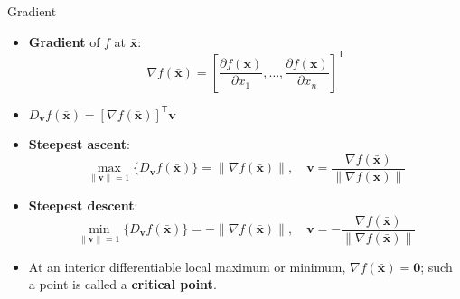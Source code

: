 \documentclass[aspectratio=169,hyperref,UTF8,CJK]{beamer}
\newcommand{\trans}{\mathsf{T}}
\newcommand{\vect}[1]{\boldsymbol{#1}}
\begin{document}
\begin{frame}{Gradient}
  \small
  \begin{itemize}
    \item \textbf{Gradient} of $f$ at $\bar{\vect{x}}$:
      \begin{equation*}
        \nabla f(\bar{\vect{x}})=
        \left[\frac{\partial f(\bar{\vect{x}})}{\partial x_1},\ldots,
        \frac{\partial f(\bar{\vect{x}})}{\partial x_n}\right]^{\trans}
      \end{equation*}
    \item $D_{\vect{v}}f(\bar{\vect{x}})=[\nabla f(\bar{\vect{x}})]^{\trans}\vect{v}$
    \item \textbf{Steepest ascent}:
      \begin{equation*}
        \max_{\|\vect{v}\|=1}\{D_{\vect{v}}f(\bar{\vect{x}})\}=\|\nabla f(\bar{\vect{x}})\|,
        \quad \vect{v}=\frac{\nabla f(\bar{\vect{x}})}{\|\nabla f(\bar{\vect{x}})\|}
      \end{equation*}
    \item \textbf{Steepest descent}:
      \begin{equation*}
        \min_{\|\vect{v}\|=1}\{D_{\vect{v}}f(\bar{\vect{x}})\}=-\|\nabla f(\bar{\vect{x}})\|,
        \quad \vect{v}=-\frac{\nabla f(\bar{\vect{x}})}{\|\nabla f(\bar{\vect{x}})\|}
      \end{equation*}
    \item At an interior differentiable local maximum or minimum,
      $\nabla f(\bar{\vect{x}})=\vect{0}$; such a point is called a
      \textbf{critical point}.
  \end{itemize}
\end{frame}
\end{document}
